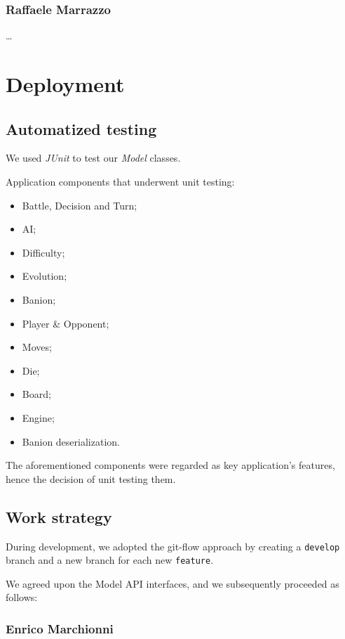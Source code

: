 \documentclass[12pt, a4paper]{report}
\theoremstyle{definition}
\begin{document}
    \subsection*{Raffaele Marrazzo}

    \dots

\chapter{Deployment}

\section{Automatized testing}

    We used \emph{JUnit} to test our \emph{Model} classes.

    Application components that underwent unit testing:

    \begin{itemize}
        \item Battle, Decision and Turn;
        \item AI;
        \item Difficulty;
        \item Evolution;
        \item Banion;
        \item Player \& Opponent;
        \item Moves;
        \item Die;
        \item Board;
        \item Engine;
        \item Banion deserialization.
    \end{itemize}

    The aforementioned components were regarded as key application's features, hence the decision of unit testing them.

\section{Work strategy}

    During development, we adopted the git-flow approach by creating a \verb|develop| branch and a new branch for each new \verb|feature|.

    We agreed upon the Model API interfaces, and we subsequently proceeded as follows:

    \subsection*{Enrico Marchionni}
\end{document}
